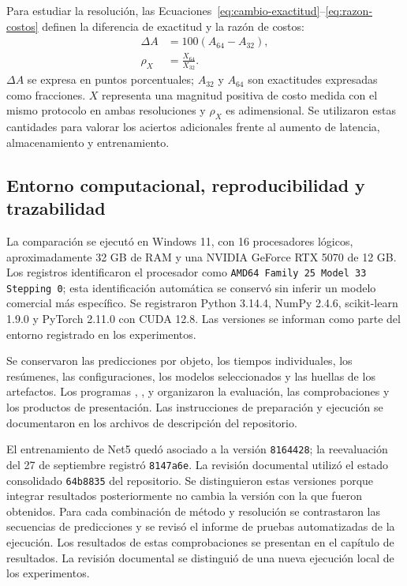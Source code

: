 Para estudiar la resolución, las Ecuaciones~\eqref{eq:cambio-exactitud}--\eqref{eq:razon-costos} definen la diferencia de exactitud y la razón de costos:
\begin{subequations}\label{eq:cambio-resolucion}
\begin{align}
\Delta A&=100\left(A_{64}-A_{32}\right), \label{eq:cambio-exactitud} \\
\rho_X&=\frac{X_{64}}{X_{32}}. \label{eq:razon-costos}
\end{align}
\end{subequations}
$\Delta A$ se expresa en puntos porcentuales; $A_{32}$ y $A_{64}$ son exactitudes expresadas como fracciones. $X$ representa una magnitud positiva de costo medida con el mismo protocolo en ambas resoluciones y $\rho_X$ es adimensional. Se utilizaron estas cantidades para valorar los aciertos adicionales frente al aumento de latencia, almacenamiento y entrenamiento.

\subsection{Entorno computacional, reproducibilidad y trazabilidad}
\label{subsec:entorno-reproducibilidad}
La comparación se ejecutó en Windows 11, con 16 procesadores lógicos, aproximadamente 32 GB de RAM y una NVIDIA GeForce RTX 5070 de 12 GB. Los registros identificaron el procesador como \texttt{AMD64 Family 25 Model 33 Stepping 0}; esta identificación automática se conservó sin inferir un modelo comercial más específico. Se registraron Python 3.14.4, NumPy 2.4.6, scikit-learn 1.9.0 y PyTorch 2.11.0 con CUDA 12.8. Las versiones se informan como parte del entorno registrado en los experimentos.

Se conservaron las predicciones por objeto, los tiempos individuales, los resúmenes, las configuraciones, los modelos seleccionados y las huellas de los artefactos. Los programas \protect{}, \protect{}, \protect{} y \protect{} organizaron la evaluación, las comprobaciones y los productos de presentación. Las instrucciones de preparación y ejecución se documentaron en los archivos de descripción del repositorio.

El entrenamiento de Net5 quedó asociado a la versión \texttt{8164428}; la reevaluación del 27 de septiembre registró \texttt{8147a6e}. La revisión documental utilizó el estado consolidado \texttt{64b8835} del repositorio. Se distinguieron estas versiones porque integrar resultados posteriormente no cambia la versión con la que fueron obtenidos. Para cada combinación de método y resolución se contrastaron las secuencias de predicciones y se revisó el informe de pruebas automatizadas de la ejecución. Los resultados de estas comprobaciones se presentan en el capítulo de resultados. La revisión documental se distinguió de una nueva ejecución local de los experimentos.
